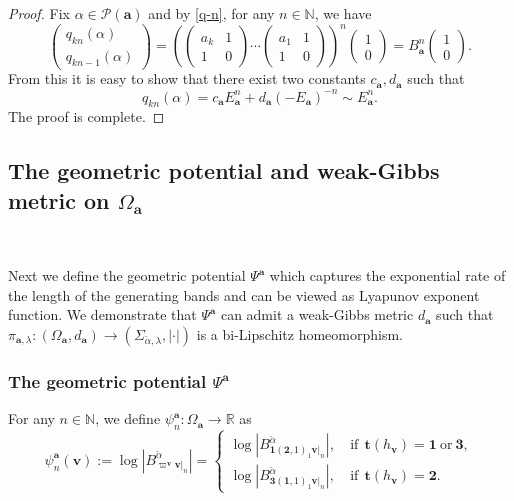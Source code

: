 \documentclass[reqno,11pt,graphicx,]{amsart}
\numberwithin{equation}{section}
\theoremstyle{plain}
\newcommand{\N}{{\mathbb N}}
\newcommand{\R}{{\mathbb R}}
\newcommand{\3}{\mathbf{3}}
\newcommand{\ma}{\mathbf{a}}
\newcommand{\mv}{\mathbf{v}}
\begin{document}
\begin{proof}
		Fix $\alpha\in\mathcal{P}(\ma)$ and by \eqref{q-n}, for any $n\in{\mathbb{N}%
		}$, we have 
		\begin{equation*}
			\left( 
			\begin{array}{c}
				q_{kn}(\alpha) \\ 
				q_{kn-1}(\alpha)
			\end{array}
			\right)=\left(\left( 
			\begin{array}{cc}
				a_k & 1 \\ 
				1 & 0%
			\end{array}
			\right)\cdots\left( 
			\begin{array}{cc}
				a_1 & 1 \\ 
				1 & 0%
			\end{array}
			\right)\right)^n\left( 
			\begin{array}{c}
				1 \\ 
				0%
			\end{array}
			\right)=B_{\ma}^n\left( 
			\begin{array}{c}
				1 \\ 
				0%
			\end{array}
			\right).
		\end{equation*}
		From this it is easy to show that there exist two constants $c_{\mathbf{a}%
		},d_{\mathbf{a}}$ such that 
		\begin{equation*}
			q_{kn}(\alpha)=c_{\mathbf{a}}E_{\mathbf{a}}^n+d_{\mathbf{a}}(-E_{\mathbf{a}%
			})^{-n}\sim E_{\mathbf{a}}^{n}. \label{qE}
		\end{equation*}
		The proof is complete.
	\end{proof}
	
	
	\subsection{The geometric potential and weak-Gibbs metric on $\Omega_{\mathbf{a}}$}\label{sec-weak-metric}\
	
	Next we define the geometric potential $\Psi^{\ma}$ which captures the exponential rate of the length of the generating bands and can be viewed as Lyapunov exponent function. We demonstrate that $\Psi^{\ma}$ can admit a weak-Gibbs metric $d_{\ma}$ such that $\pi_{\ma,\lambda}:(\Omega_{\mathbf{a}%
	},d_{\ma})\to(\Sigma_{\check{\alpha},\lambda},|\cdot|)$ is a bi-Lipschitz
	homeomorphism.
	\subsubsection{The geometric potential $\Psi^{\ma}$}
	For any $n\in\N$, we define $\psi_n^{\ma}:\Omega_{\ma}\to\R$ as 
	\begin{equation}\label{def-psi}
		\psi^{\ma}_{n}(\mv):=\log|B^{\check{\alpha}}_{\varpi^{\mv}\mv|_n}|=%
		\begin{cases}
			\log|B^{\check{\alpha}}_{\mathbf{1}(\mathbf{2},1)_1\mv|_n}|, \  & %
			\mbox{if}\ \ \mathbf{t}(h_{\mv})=\mathbf{1}\ \text{or}\ \mathbf{3}, \\ 
			\log|B^{\check{\alpha}}_{\mathbf{3}(\mathbf{1},1)_1\mv|_n}|, \  & %
			\mbox{if}\ \ \mathbf{t}(h_{\mv})=\mathbf{2}.
		\end{cases}
	\end{equation}
	
\end{document}
